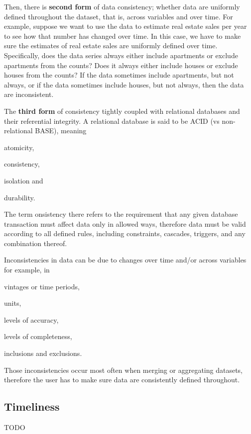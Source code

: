 Then, there is \textbf{second form} of data consistency; whether data are uniformly defined throughout the dataset, that is, across variables and over time.
For example, suppose we want to use the data to estimate real estate sales per year to see how that number has changed over time.
In this case, we have to make sure the estimates of real estate sales are uniformly defined over time.
Specifically, does the data series always either include apartments or exclude apartments from the counts?
Does it always either include houses or exclude houses from the counts?
If the data sometimes include apartments, but not always, or if the data sometimes include houses, but not always, then the data are inconsistent.

The \textbf{third form} of consistency tightly coupled with relational databases and their referential integrity.
A relational database is said to be ACID (vs non-relational BASE), meaning
\begin{enumerate*}[label=(\roman*)]
    \item atomicity,
    \item consistency,
    \item isolation and
    \item durability.
\end{enumerate*}
The term onsistency there refers to the requirement that any given database transaction must affect data only in allowed ways, therefore data must be valid according to all defined rules, including constraints, cascades, triggers, and any combination thereof.

Inconsistencies in data can be due to changes over time and/or across variables for example, in
\begin{enumerate*}[label=(\roman*)]
    \item vintages or time periods,
    \item units,
    \item levels of accuracy,
    \item levels of completeness,
    \item inclusions and exclusions.
\end{enumerate*}
Those inconsistencies occur most often when merging or aggregating datasets, therefore the user has to make sure data are consistently defined throughout.

\subsection{Timeliness}

TODO
